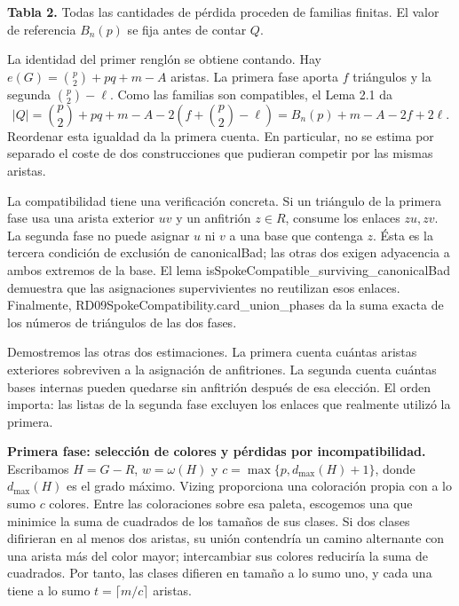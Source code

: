 \documentclass[spanish,11pt,a4paper]{article}
\begin{document}
\textbf{Tabla 2.} Todas las cantidades de pérdida proceden de familias finitas. El valor de referencia \(B_n(p)\) se fija antes de contar \(Q\).

La identidad del primer renglón se obtiene contando. Hay \(e(G)=\binom p2+pq+m-A\) aristas. La primera fase aporta \(f\) triángulos y la segunda \(\binom p2-\ell\). Como las familias son compatibles, el Lema 2.1 da \[
|Q|=\binom p2+pq+m-A-2\left(f+\binom p2-\ell\right)
=B_n(p)+m-A-2f+2\ell.
\tag{5.4a}
\] Reordenar esta igualdad da la primera cuenta. En particular, no se estima por separado el coste de dos construcciones que pudieran competir por las mismas aristas.

La compatibilidad tiene una verificación concreta. Si un triángulo de la primera fase usa una arista exterior \(uv\) y un anfitrión \(z\in R\), consume los enlaces \(zu,zv\). La segunda fase no puede asignar \(u\) ni \(v\) a una base que contenga \(z\). Ésta es la tercera condición de exclusión de {\ttfamily\small canonicalBad}; las otras dos exigen adyacencia a ambos extremos de la base. El lema {\ttfamily\small isSpokeCompa\discretionary{\hbox{\ensuremath{\hookrightarrow}}}{}{}tible\_\discretionary{\hbox{\ensuremath{\hookrightarrow}}}{}{}surviving\_\discretionary{\hbox{\ensuremath{\hookrightarrow}}}{}{}canonicalBad} demuestra que las asignaciones supervivientes no reutilizan esos enlaces. Finalmente, {\ttfamily\small RD09SpokeCom\discretionary{\hbox{\ensuremath{\hookrightarrow}}}{}{}patibility.\discretionary{\hbox{\ensuremath{\hookrightarrow}}}{}{}card\_\discretionary{\hbox{\ensuremath{\hookrightarrow}}}{}{}union\_\discretionary{\hbox{\ensuremath{\hookrightarrow}}}{}{}phases} da la suma exacta de los números de triángulos de las dos fases.

Demostremos las otras dos estimaciones. La primera cuenta cuántas aristas exteriores sobreviven a la asignación de anfitriones. La segunda cuenta cuántas bases internas pueden quedarse sin anfitrión después de esa elección. El orden importa: las listas de la segunda fase excluyen los enlaces que realmente utilizó la primera.

\textbf{Primera fase: selección de colores y pérdidas por incompatibilidad.} Escribamos \(H=G-R\), \(w=\omega(H)\) y \(c=\max\{p,d_{\max}(H)+1\}\), donde \(d_{\max}(H)\) es el grado máximo. Vizing proporciona una coloración propia con a lo sumo \(c\) colores. Entre las coloraciones sobre esa paleta, escogemos una que minimice la suma de cuadrados de los tamaños de sus clases. Si dos clases difirieran en al menos dos aristas, su unión contendría un camino alternante con una arista más del color mayor; intercambiar sus colores reduciría la suma de cuadrados. Por tanto, las clases difieren en tamaño a lo sumo uno, y cada una tiene a lo sumo \(t=\lceil m/c\rceil\) aristas.
\end{document}
